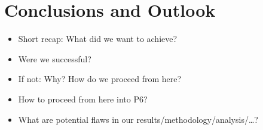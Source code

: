 \chapter{Conclusions and Outlook}
\label{chap:conclusions}

\begin{itemize}\tightlist
    \item
        Short recap: What did we want to achieve?
    \item
        Were we successful?
    \item
        If not: Why? How do we proceed from here?
    \item
        How to proceed from here into P6?
    \item
        What are potential flaws in our results/methodology/analysis/\ldots?
\end{itemize}
